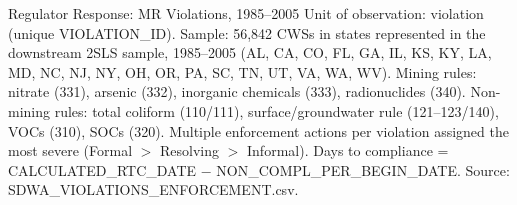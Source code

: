 
\begin{frame}{Regulator Response: MR Violations, 1985--2005}
\label{tab:reg_response_mr}
{\tiny Unit of observation: violation (unique VIOLATION\_ID). Sample: 56,842 CWSs in states represented in the downstream 2SLS sample, 1985--2005 (AL, CA, CO, FL, GA, IL, KS, KY, LA, MD, NC, NJ, NY, OH, OR, PA, SC, TN, UT, VA, WA, WV). Mining rules: nitrate (331), arsenic (332), inorganic chemicals (333), radionuclides (340). Non-mining rules: total coliform (110/111), surface/groundwater rule (121--123/140), VOCs (310), SOCs (320). Multiple enforcement actions per violation assigned the most severe (Formal $>$ Resolving $>$ Informal). Days to compliance = CALCULATED\_RTC\_DATE $-$ NON\_COMPL\_PER\_BEGIN\_DATE. Source: SDWA\_VIOLATIONS\_ENFORCEMENT.csv.}
\end{frame}


